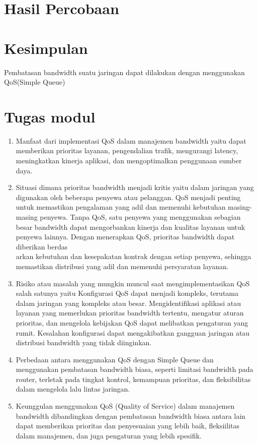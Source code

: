 \section{Hasil Percobaan}


\section{Kesimpulan}

Pembatasan bandwidth suatu jaringan dapat dilakukan dengan menggunakan QoS(Simple Queue)

\section{Tugas modul}

\begin{enumerate}
    \item Manfaat dari implementasi QoS dalam manajemen bandwidth yaitu dapat memberikan prioritas layanan, pengendalian trafik, mengurangi latency,\\ meningkatkan kinerja aplikasi, dan mengoptimalkan penggunaan sumber daya.

    \item Situasi dimana prioritas bandwidth menjadi kritis yaitu dalam jaringan yang digunakan oleh beberapa penyewa atau pelanggan. QoS menjadi penting untuk memastikan pengalaman yang adil dan memenuhi kebutuhan masing-masing penyewa. Tanpa QoS, satu penyewa yang menggunakan sebagian besar bandwidth dapat mengorbankan kinerja dan kualitas layanan untuk penyewa lainnya. Dengan menerapkan QoS, prioritas bandwidth dapat diberikan berdas\\arkan kebutuhan dan kesepakatan kontrak dengan setiap penyewa, sehingga memastikan distribusi yang adil dan memenuhi persyaratan layanan.
    
    \item Risiko atau masalah yang mungkin muncul saat mengimplementasikan QoS salah satunya yaitu Konfigurasi QoS dapat menjadi kompleks, terutama dalam jaringan yang kompleks atau besar. Mengidentifikasi aplikasi atau layanan yang memerlukan prioritas bandwidth tertentu, mengatur aturan prioritas, dan mengelola kebijakan QoS dapat melibatkan pengaturan yang rumit. Kesalahan konfigurasi dapat mengakibatkan gangguan jaringan atau distribusi bandwidth yang tidak diinginkan.
    
    \item Perbedaan antara menggunakan QoS dengan Simple Queue dan menggunakan pembatasan bandwidth biasa, seperti limitasi bandwidth pada router, terletak pada tingkat kontrol, kemampuan prioritas, dan fleksibilitas dalam mengelola lalu lintas jaringan.
    
    \item Keunggulan menggunakan QoS (Quality of Service) dalam manajemen bandwidth dibandingkan dengan pembatasan bandwidth biasa antara lain dapat memberikan prioritas dan penyesuaian yang lebih baik, fleksiilitas dalam manajemen, dan juga pengaturan yang lebih spesifik.
    
\end{enumerate}
